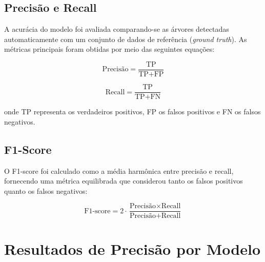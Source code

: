 \documentclass[
    12pt,
    openright,
    oneside,
    a4paper,
    sumario=tradicional,
    english,
    brazil,
    ]{abntex2}
\begin{document}
\subsection{Precisão e Recall}

A acurácia do modelo foi avaliada comparando-se as árvores detectadas automaticamente com um conjunto de dados de referência (\textit{ground truth}). As métricas principais foram obtidas por meio das seguintes equações:

\begin{equation}
    \text{Precisão} = \frac{\text{TP}}{\text{TP} + \text{FP}}
\end{equation}

\begin{equation}
    \text{Recall} = \frac{\text{TP}}{\text{TP} + \text{FN}}
\end{equation}

onde TP representa os verdadeiros positivos, FP os falsos positivos e FN os falsos negativos.

\subsection{F1-Score}

O F1-score foi calculado como a média harmônica entre precisão e recall, fornecendo uma métrica equilibrada que considerou tanto os falsos positivos quanto os falsos negativos:

\begin{equation}
    \text{F1-score} = 2 \cdot \frac{\text{Precisão} \times \text{Recall}}{\text{Precisão} + \text{Recall}}
\end{equation}

\section{Resultados de Precisão por Modelo}
\end{document}
